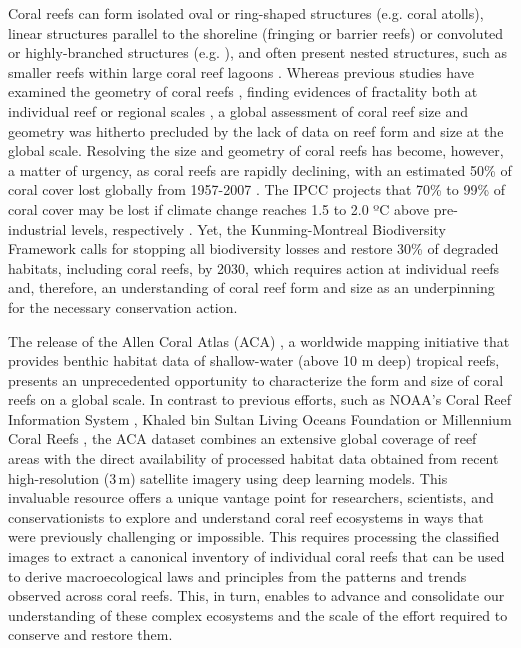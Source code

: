 Coral reefs can form isolated oval or ring-shaped structures (e.g. coral
atolls), linear structures parallel to the shoreline (fringing or barrier
reefs) or convoluted or highly-branched structures (e.g. \cite{Purkis2007}),
and often present nested structures, such as smaller reefs within large coral
reef lagoons \cite{Bradbury1983}. Whereas previous studies have examined the
geometry of coral reefs \cite{Bradbury1983,Purkis2007,
    Zawada2009,Alvarez_Filip2009,Bozec2015, Sous2020}, finding evidences of
fractality both at individual reef \cite{Bradbury1983,Sous2020} or regional
scales \cite{Purkis2007, Zawada2009}, a global assessment of coral reef size
and geometry was hitherto precluded by the lack of data on reef form and size
at the global scale. Resolving the size and geometry of coral reefs has become,
however, a matter of urgency, as coral reefs are rapidly declining, with an
estimated 50\% of coral cover lost globally from 1957-2007
\cite{eddy2021global}. The IPCC projects that 70\% to 99\% of coral cover may
be lost if climate change reaches 1.5 to 2.0 ºC above pre-industrial levels,
respectively \cite{bindoff2019changing}. Yet, the Kunming-Montreal Biodiversity
Framework \cite{kunming-montreal-framework} calls for stopping all biodiversity
losses and restore 30\% of degraded habitats, including coral reefs, by 2030,
which requires action at individual reefs and, therefore, an understanding of
coral reef form and size as an underpinning for the necessary conservation
action.

The release of the Allen Coral Atlas (ACA) \cite{allen-coral-atlas}, a
worldwide mapping initiative that provides benthic habitat data of
shallow-water (above 10 m deep) tropical reefs, presents an unprecedented
opportunity to characterize the form and size of coral reefs on a global scale.
In contrast to previous efforts, such as NOAA’s Coral Reef Information System
\cite{oconnor2020}, Khaled bin Sultan Living Oceans Foundation
\cite{globalreefexpedition2021} or Millennium Coral Reefs \cite{unep2010}, the
ACA dataset combines an extensive global coverage of reef areas with the direct
availability of processed habitat data obtained from recent high-resolution
(3\,m) satellite imagery using deep learning models. This invaluable resource
offers a unique vantage point for researchers, scientists, and conservationists
to explore and understand coral reef ecosystems in ways that were previously
challenging or impossible. This requires processing the classified images to
extract a canonical inventory of individual coral reefs that can be used to
derive macroecological laws and principles from the patterns and trends
observed across coral reefs. This, in turn, enables to advance and consolidate
our understanding of these complex ecosystems and the scale of the effort
required to conserve and restore them.

